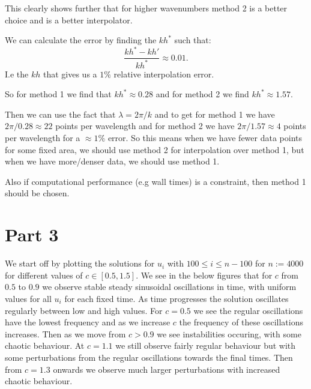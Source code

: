 \documentclass[a4paper, oneside]{book}
\begin{document}
This clearly shows further that for higher wavenumbers method 2 is a better choice
and is a better interpolator.

We can calculate the error by finding the $kh^*$ such that:
\[
\frac{kh^* - kh'}{kh^*} \approx 0.01
.\]
I.e the $kh$ that gives us a $1\%$ relative interpolation error.

So for method 1 we find that $kh^* \approx 0.28$ and for method 2 we find  $kh^* \approx 1.57$.

Then we can use the fact that $\lambda = 2\pi / k$ and to get for method 1 we have
$2\pi / 0.28 \approx 22$ points per wavelength and for method 2 we have $2\pi / 1.57 \approx 4$ points
per wavelength for a $\approx 1\%$ error. So this means when we have fewer data points
for some fixed area, we should use method 2 for interpolation over method 1,
but when we have more/denser data, we should use method 1.


Also if computational performance (e.g wall times) is a constraint,
then method 1 should be chosen.





\section*{Part 3}
We start off by plotting the solutions for $u_{i}$ with $100 \leq i \leq n - 100$ for $n := 4000$ 
for different values of $c \in [0.5, 1.5]$. We see in the below figures that for $c$ from $0.5$ to $0.9$
we observe stable steady sinusoidal oscillations in time, with uniform values for all $u_{i}$ for each fixed
time. As time progresses the solution oscillates regularly between low and high values.
For $c=0.5$ we see the regular oscillations have the lowest frequency and as we increase
$c$ the frequency of these oscillations increases. Then as we move from $c > 0.9$ we see
instabilities occuring, with some chaotic behaviour. At $c=1.1$ we still observe
fairly regular behaviour but with some perturbations from the regular oscillations
towards the final times. Then from $c=1.3$ onwards we observe much larger
perturbations with increased chaotic behaviour.
\end{document}

